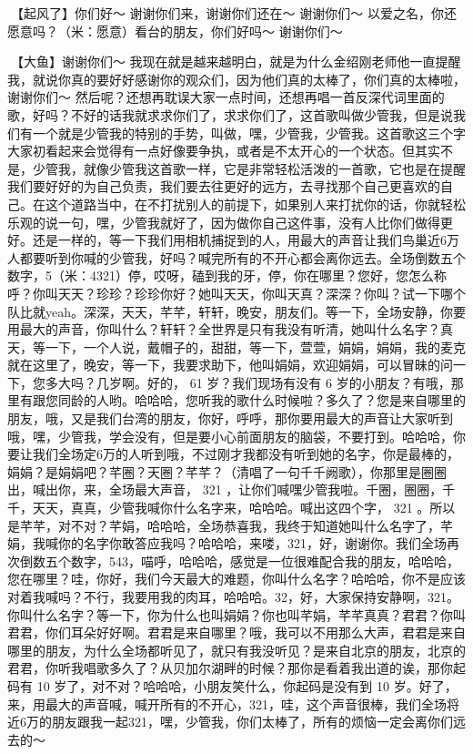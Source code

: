 \documentclass[
]{book}
\begin{document}
🎵【起风了】你们好～ 谢谢你们来，谢谢你们还在～ 谢谢你们～ 以爱之名，你还愿意吗？（米：愿意）看台的朋友，你们好吗～ 谢谢你们～

🎵【大鱼】谢谢你们～ 我现在就是越来越明白，就是为什么金绍刚老师他一直提醒我，就说你真的要好好感谢你的观众们，因为他们真的太棒了，你们真的太棒啦，谢谢你们～
然后呢？还想再耽误大家一点时间，还想再唱一首反深代词里面的歌，好吗？不好的话我就求求你们了，求求你们了，这首歌叫做少管我，但是说我们有一个就是少管我的特别的手势，叫做，嘿，少管我，少管我。这首歌这三个字大家初看起来会觉得有一点好像要争执，或者是不太开心的一个状态。但其实不是，少管我，就像少管我这首歌一样，它是非常轻松活泼的一首歌，它也是在提醒我们要好好的为自己负责，我们要去往更好的远方，去寻找那个自己更喜欢的自己。在这个道路当中，在不打扰别人的前提下，如果别人来打扰你的话，你就轻松乐观的说一句，嘿，少管我就好了，因为做你自己这件事，没有人比你们做得更好。还是一样的，等一下我们用相机捕捉到的人，用最大的声音让我们鸟巢近6万人都要听到你喊的少管我，好吗？喊完所有的不开心都会离你远去。全场倒数五个数字，5（米：4321）停，哎呀，磕到我的牙，停，你在哪里？您好，您怎么称呼？你叫天天？珍珍？珍珍你好？她叫天天，你叫天真？深深？你叫？试一下哪个队比就yeah。深深，天天，芊芊，轩轩，晚安，朋友们。等一下，全场安静，你要用最大的声音，你叫什么？轩轩？全世界是只有我没有听清，她叫什么名字？真天，等一下，一个人说，戴帽子的，甜甜，等一下，萱萱，娟娟，娟娟，我的麦克就在这里了，晚安，等一下，我要求助下，他叫娟娟，欢迎娟娟，可以冒昧的问一下，您多大吗？几岁啊。好的， 61 岁？我们现场有没有 6 岁的小朋友？有哦，那里有跟您同龄的人哟。哈哈哈，您听我的歌什么时候啦？多久了？您是来自哪里的朋友，哦，又是我们台湾的朋友，你好，呼呼，那你要用最大的声音让大家听到哦，嘿，少管我，学会没有，但是要小心前面朋友的脑袋，不要打到。哈哈哈，你要让我们全场定6万的人听到哦，不过刚才我都没有听到她的名字，你是最棒的，娟娟？是娟娟吧？芊圈？天圈？芊芊？（清唱了一句千千阙歌），你那里是圈圈出，喊出你，来，全场最大声音， 321 ，让你们喊嘿少管我啦。千圈，圈圈，千千，天天，真真，少管我喊你什么名字来，哈哈哈。喊出这四个字， 321 。所以是芊芊，对不对？芊娟，哈哈哈，全场恭喜我，我终于知道她叫什么名字了，芊娟，我喊你的名字你敢答应我吗？哈哈哈，来喽，321，好，谢谢你。我们全场再次倒数五个数字，543，喵呼，哈哈哈，感觉是一位很难配合我的朋友，哈哈哈，您在哪里？哇，你好，我们今天最大的难题，你叫什么名字？哈哈哈，你不是应该对着我喊吗？不行，我要用我的肉耳，哈哈哈。32，好，大家保持安静啊，321。你叫什么名字？等一下，你为什么也叫娟娟？你也叫芊娟，芊芊真真？君君？你叫君君，你们耳朵好好啊。君君是来自哪里？哦，我可以不用那么大声，君君是来自哪里的朋友，为什么全场都听见了，就只有我没听见？是来自北京的朋友，北京的君君，你听我唱歌多久了？从贝加尔湖畔的时候？那你是看着我出道的诶，那你起码有 10 岁了，对不对？哈哈哈，小朋友笑什么，你起码是没有到 10 岁。好了，来，用最大的声音喊，喊开所有的不开心，321，哇，这个声音很棒，我们全场将近6万的朋友跟我一起321，嘿，少管我，你们太棒了，所有的烦恼一定会离你们远去的～
\end{document}

